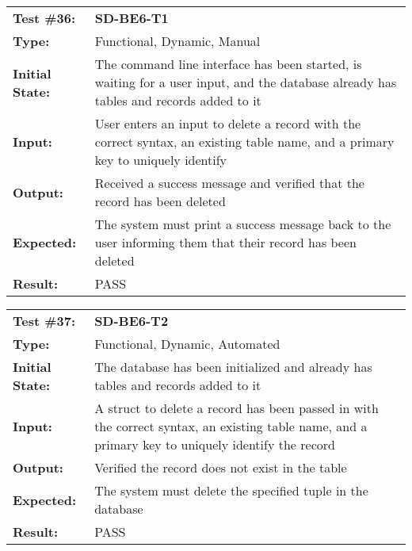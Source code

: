 \documentclass[12pt, titlepage]{article}
\begin{document}
\begin{mdframed}[linewidth=1pt]
\begin{tabularx}{\textwidth}{@{}p{3cm}X@{}}
{\bf Test \#36:} & {\bf SD-BE6-T1}\\[\baselineskip]
{\bf Type:} & Functional, Dynamic, Manual \\[0.5\baselineskip]
{\bf Initial State:} & The command line interface has been started, is waiting for a user input, and the database already has tables and records added to it \\[\baselineskip]
{\bf Input:} & User enters an input to delete a record with the correct syntax, an existing table name, and a primary key to uniquely identify  \\[\baselineskip]
{\bf Output:} & Received a success message and verified that the record has been deleted \\[\baselineskip]
{\bf Expected:} & The system must print a success message back to the user informing them that their record has been deleted \\[\baselineskip]
{\bf Result:} & PASS
\end{tabularx}
\end{mdframed} 

\begin{mdframed}[linewidth=1pt]
\begin{tabularx}{\textwidth}{@{}p{3cm}X@{}}
{\bf Test \#37:} & {\bf SD-BE6-T2}\\[\baselineskip]
{\bf Type:} & Functional, Dynamic, Automated \\[0.5\baselineskip]
{\bf Initial State:} & The database has been initialized and already has tables and records added to it \\[\baselineskip]
{\bf Input:} & A struct to delete a record has been passed in with the correct syntax, an existing table name, and a primary key to uniquely identify the record \\[\baselineskip]
{\bf Output:} & Verified the record does not exist in the table \\[\baselineskip]
{\bf Expected:} & The system must delete the specified tuple in the database \\[\baselineskip]
{\bf Result:} & PASS
\end{tabularx}
\end{mdframed} 
\end{document}
